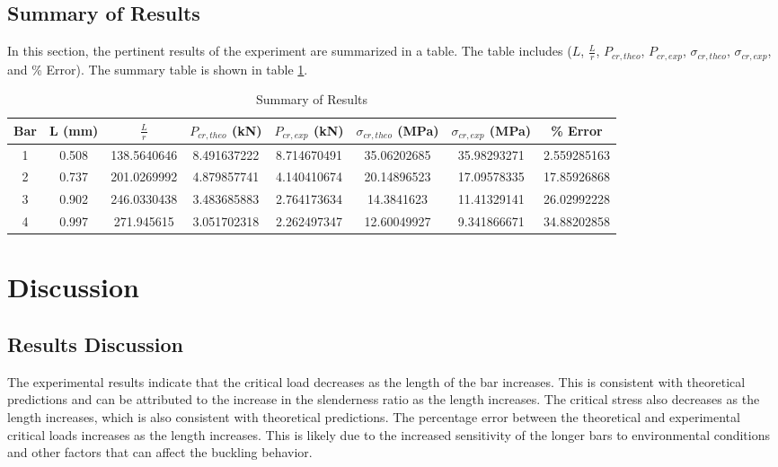 \documentclass[12pt, titlepage]{article}
\begin{document}
\subsection{Summary of Results}
In this section, the pertinent results of the experiment are summarized in
a table. The table includes ($L$, $\frac{L}{r}$, $P_{cr,theo}$, $P_{cr,exp}$,
$\sigma_{cr,theo}$, $\sigma_{cr,exp}$, and \% Error). The summary table is
shown in table \ref{tab:summary}.
\begin{table}[H]
    \centering
    \caption{Summary of Results}
    \label{tab:summary}
    \begin{adjustwidth}{-1in}{-1in}
        \begin{tabular}{|c|c|c|c|c|c|c|c|}
            \hline
            \textbf{Bar} & \textbf{L (mm)} & \textbf{$\frac{L}{r}$} & \textbf{$P_{cr,theo}$ (kN)} & \textbf{$P_{cr,exp}$ (kN)} & \textbf{$\sigma_{cr,theo}$ (MPa)} & \textbf{$\sigma_{cr,exp}$ (MPa)} & \textbf{\% Error}\\
            \hline
            1 & 0.508 & 138.5640646 & 8.491637222 & 8.714670491 & 35.06202685 & 35.98293271 & 2.559285163 \\
            \hline
            2 & 0.737 & 201.0269992 & 4.879857741 & 4.140410674 & 20.14896523 & 17.09578335 & 17.85926868 \\
            \hline
            3 & 0.902 & 246.0330438 & 3.483685883 & 2.764173634 & 14.3841623 & 11.41329141 & 26.02992228 \\
            \hline
            4 & 0.997 & 271.945615 & 3.051702318 & 2.262497347 & 12.60049927 & 9.341866671 & 34.88202858 \\
            \hline
        \end{tabular}
    \end{adjustwidth}
\end{table}
\newpage
\section{Discussion}
\subsection{Results Discussion}
The experimental results indicate that the critical load decreases as the
length of the bar increases. This is consistent with theoretical predictions
and can be attributed to the increase in the slenderness ratio as the length
increases. The critical stress also decreases as the length increases, which
is also consistent with theoretical predictions. The percentage error between
the theoretical and experimental critical loads increases as the length
increases. This is likely due to the increased sensitivity of the longer bars
to environmental conditions and other factors that can affect the buckling
behavior.
\end{document}
